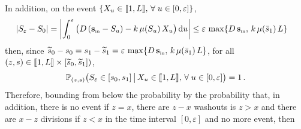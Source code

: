 \documentclass[10pt]{amsart}
\theoremstyle{definition}\newtheorem{defi}[theo]{Definition}\newtheorem{rema}[theo]{Remark}\newtheorem{exam}[theo]{Example}\newtheorem{exem}[theo]{Example}\newtheorem{nota}[theo]{Notation}
\newcommand{\llbracket}{\mathopen{[\mkern -2.7mu[}}
\newcommand{\rrbracket}{\mathclose{]\mkern -2.7mu]}}
\newcommand{\PP}{\mathbb{P}}
\newcommand{\Sin}{{\mathbf s}_{\textrm{\tiny\rm in}}}
\newcommand{\dif}{\mathrm{d}}
\newcommand{\barmu}{\mu(\bar s_1)}
\newcommand{\1}{\mathbf{1}}
\let\oldtilde\tilde
\renewcommand*{\tilde}[1]{\mathchoice{\widetilde{#1}}{\widetilde{#1}}{\oldtilde{#1}}{\oldtilde{#1}}}
\let\oldforall\forall
\renewcommand*{\forall}{\mathrel{\oldforall}}
\begin{document}
In addition, on the event $\left\{X_u \in \llbracket 1, L \rrbracket,\, \forall u\in[0,\varepsilon]\right\}$,
\begin{align*}
\left|S_\varepsilon-S_0 \right| &= \left|\int_0^\varepsilon \big(D\,(\Sin-S_u)-k\,\mu(S_u)\,X_u \big)\,\dif u\right|
\leq \varepsilon\,\max\{D\,\Sin,\, k\,\barmu\, L\}
\end{align*}
then, since $\tilde s_0-s_0=s_1-\tilde s_1=\varepsilon\,\max\{D\,\Sin,\, k\,\barmu\, L\}$, for all $(z,s)\in \llbracket 1, L \rrbracket \times [\tilde s_0,\tilde s_1])$,
\[
\PP_{(z,s)}\big(S_\varepsilon \in [s_0,s_1] \, \big| \, X_u \in \llbracket 1, L \rrbracket,\, \forall u\in[0,\varepsilon]\big) =1\,.
\]
Therefore, bounding from below the probability by the probability that, in addition, there is no event if $z=x$, there are $z-x$ washouts is $z>x$ and there are $x-z$ divisions if $z<x$ in the time interval $[0,\varepsilon]$ and no more event, then
\end{document}
